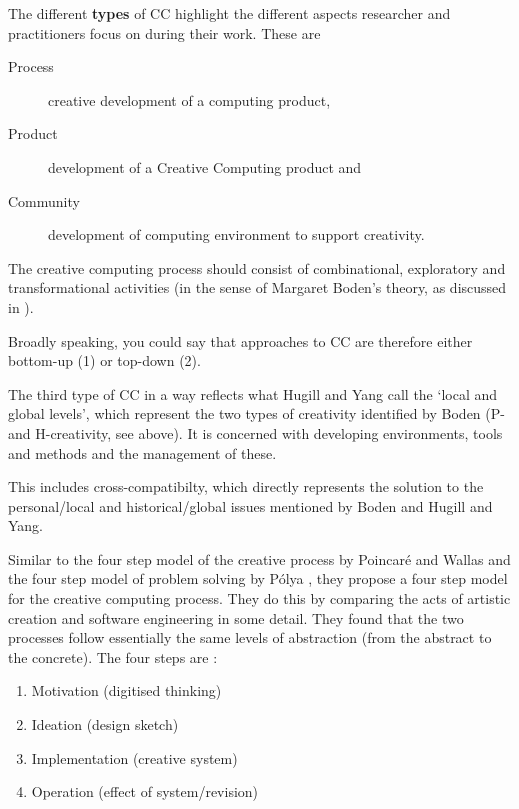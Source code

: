 The different \textbf{types} of \ac{CC} highlight the different aspects researcher and practitioners focus on during their work. These are

\begin{description}
  \item [Process]  creative development of a computing product,
  \item [Product] development of a Creative Computing product and
  \item [Community] development of computing environment to support creativity.
\end{description}

The creative computing process should consist of combinational, exploratory and transformational activities (in the sense of Margaret Boden’s theory, as discussed in ).

\begin{draft}
  Broadly speaking, you could say that approaches to \ac{CC} are therefore either bottom-up (1) or top-down (2).
\end{draft}

The third type of \ac{CC} in a way reflects what Hugill and Yang call the `local and global levels', which represent the two types of creativity identified by Boden (P- and H-creativity, see above). It is concerned with developing environments, tools and methods and the management of these.

\begin{draft}
  This includes cross-compatibilty, which directly represents the solution to the personal/local and historical/global issues mentioned by Boden and Hugill and Yang.
\end{draft}

Similar to the four step model of the creative process by Poincaré and Wallas \autocite{Poincare2001, Wallas1926} and the four step model of problem solving by Pólya \autocite{Polya1957}, they propose a four step model for the creative computing process. They do this by comparing the acts of artistic creation and software engineering in some detail. They found that the two processes follow essentially the same levels of abstraction (from the abstract to the concrete). The four steps are \autocite[p.15]{Hugill2013c}:

\begin{enumerate}
  \item Motivation (digitised thinking)
  \item Ideation (design sketch)
  \item Implementation (creative system)
  \item Operation (effect of system/revision)
\end{enumerate}

